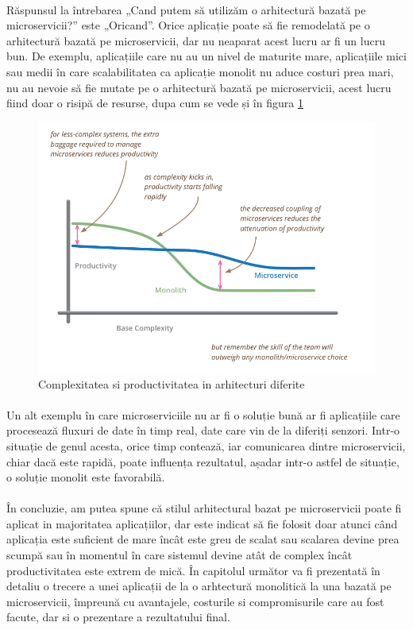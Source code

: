 \documentclass[12pt]{report}
\begin{document}
  	\paragraph{} Răspunsul la întrebarea „Cand putem să utilizăm o arhitectură bazată pe microservicii?” este „Oricand”. Orice aplicație poate să fie remodelată pe o arhitectură bazată pe microservicii, dar nu neaparat acest lucru ar fi un lucru bun. De exemplu, aplicațiile care nu au un nivel de maturite mare, aplicațiile mici sau medii în care scalabilitatea ca aplicație monolit nu aduce costuri prea mari, nu au nevoie să fie mutate pe o arhitectură bazată pe microservicii, acest lucru fiind doar o risipă de resurse, dupa cum se vede și în figura \ref{fowler}
  	\begin{figure}[h]
  	\centering
  	\includegraphics[scale=0.9]{fowler}
	\caption{Complexitatea si productivitatea in arhitecturi diferite \cite{fowler2}}
	\label{fowler}
  	\end{figure}
  	\paragraph{}Un alt exemplu în care microserviciile nu ar fi o soluție bună ar fi aplicațiile care procesează fluxuri de date în timp real, date care vin de la diferiți senzori. Intr-o situație de genul acesta, orice timp contează, iar comunicarea dintre microservicii, chiar dacă este rapidă, poate influența rezultatul, așadar intr-o astfel de situație, o soluție monolit este favorabilă.
  	\paragraph{}În concluzie, am putea spune că stilul arhitectural bazat pe microservicii poate fi aplicat in majoritatea aplicațiilor, dar este indicat să fie folosit doar atunci când aplicația este suficient de mare încât este greu de scalat sau scalarea devine prea scumpă sau în momentul în care sistemul devine atât de complex încât productivitatea este extrem de mică. În capitolul următor va fi prezentată în detaliu o trecere a unei aplicații de la o arhtectură monolitică la una bazată pe microservicii, împreună cu avantajele, costurile si compromisurile care au fost facute, dar si o prezentare a rezultatului final.
\end{document}

